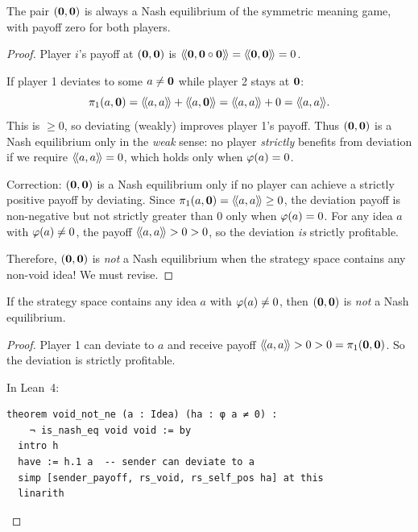 \begin{theorem}
\label{thm:void-equilibrium}
The pair $(\mathbf{0}, \mathbf{0})$ is always a Nash equilibrium of the symmetric meaning
game, with payoff zero for both players.
\end{theorem}

\begin{proof}
Player $i$'s payoff at $(\mathbf{0}, \mathbf{0})$ is $\langle\!\langle \mathbf{0}, \mathbf{0} \circ \mathbf{0} \rangle\!\rangle =
\langle\!\langle \mathbf{0}, \mathbf{0} \rangle\!\rangle = 0$.

If player 1 deviates to some $a \neq \mathbf{0}$ while player 2 stays at $\mathbf{0}$:
\[
  \payoff{1}{a, \void} = \rs{a}{a} + \rs{a}{\void} = \rs{a}{a} + 0 = \rs{a}{a}.
\]
This is $\geq 0$, so deviating (weakly) improves player 1's payoff. Thus
$(\mathbf{0}, \mathbf{0})$ is a Nash equilibrium only in the \emph{weak} sense: no player
\emph{strictly} benefits from deviation if we require $\langle\!\langle a, a \rangle\!\rangle = 0$, which
holds only when $\varphi(a) = 0$.

Correction: $(\mathbf{0}, \mathbf{0})$ is a Nash equilibrium only if no player can achieve
a strictly positive payoff by deviating. Since $\pi_{1}(a, \mathbf{0}) = \langle\!\langle a, a \rangle\!\rangle
\geq 0$, the deviation payoff is non-negative but not strictly greater than 0
only when $\varphi(a) = 0$. For any idea $a$ with $\varphi(a) \neq 0$, the payoff
$\langle\!\langle a, a \rangle\!\rangle > 0 > 0$, so the deviation \emph{is} strictly profitable.

Therefore, $(\mathbf{0}, \mathbf{0})$ is \emph{not} a Nash equilibrium when the strategy
space contains any non-void idea! We must revise.
\end{proof}

\begin{theorem}
\label{thm:void-not-ne}
If the strategy space contains any idea $a$ with $\varphi(a) \neq 0$, then
$(\mathbf{0}, \mathbf{0})$ is \emph{not} a Nash equilibrium.
\end{theorem}

\begin{proof}
Player 1 can deviate to $a$ and receive payoff $\langle\!\langle a, a \rangle\!\rangle > 0 > 0 =
\pi_{1}(\mathbf{0}, \mathbf{0})$. So the deviation is strictly profitable.

In Lean~4:
\begin{lstlisting}
theorem void_not_ne (a : Idea) (ha : φ a ≠ 0) :
    ¬ is_nash_eq void void := by
  intro h
  have := h.1 a  -- sender can deviate to a
  simp [sender_payoff, rs_void, rs_self_pos ha] at this
  linarith
\end{lstlisting}
\end{proof}

